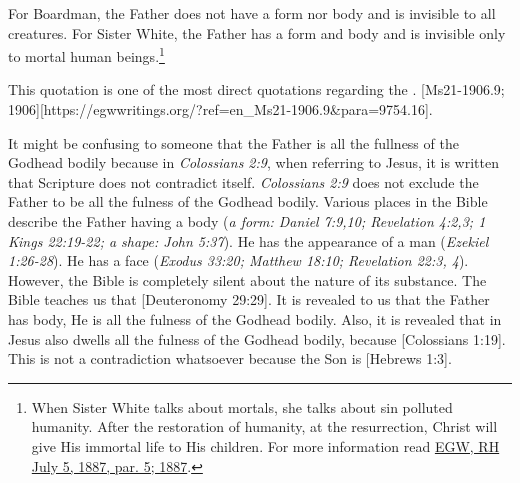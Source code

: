 For Boardman, the Father does not have a form nor body and is invisible to all creatures. For Sister White, the Father has a form and body and is invisible only to mortal human beings.\footnote{When Sister White talks about mortals, she talks about sin polluted humanity. After the restoration of humanity, at the resurrection, Christ will give His immortal life to His children. For more information read \href{https://egwwritings.org/?ref=en_RH.July.5.1887.par.5}{EGW, RH July 5, 1887, par. 5; 1887}.}

This quotation is one of the most direct quotations regarding the . [Ms21-1906.9; 1906][https://egwwritings.org/?ref=en\_Ms21-1906.9&para=9754.16].

It might be confusing to someone that the Father is all the fullness of the Godhead bodily because in \textit{Colossians 2:9}, when referring to Jesus, it is written that  Scripture does not contradict itself. \textit{Colossians 2:9} does not exclude the Father to be all the fulness of the Godhead bodily. Various places in the Bible describe the Father having a body (\textit{a form: Daniel 7:9,10; Revelation 4:2,3; 1 Kings 22:19-22; a shape: John 5:37}). He has the appearance of a man (\textit{Ezekiel 1:26-28}). He has a face (\textit{Exodus 33:20; Matthew 18:10; Revelation 22:3, 4}). However, the Bible is completely silent about the nature of its substance. The Bible teaches us that [Deuteronomy 29:29]. It is revealed to us that the Father has body, He is all the fulness of the Godhead bodily. Also, it is revealed that in Jesus also dwells all the fulness of the Godhead bodily, because [Colossians 1:19]. This is not a contradiction whatsoever because the Son is [Hebrews 1:3].

